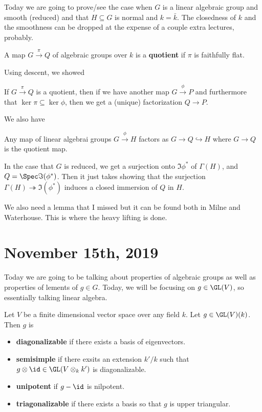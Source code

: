 \documentclass[12pt]{article}
\begin{document}
Today we are going to prove/see the case when $G$ is a linear algebraic group and smooth (reduced) and that $H\subseteq G$ is normal and $k=\bar k$.
The closedness of $k$ and the smoothness can be dropped at the expense of a couple extra lectures, probably.

\begin{defn}
	A map $G\xrightarrow{\pi} Q$ of algebraic groups over $k$ is a \textbf{quotient} if $\pi$ is faithfully flat.
\end{defn}

Using descent, we showed 
\begin{prop}
	If $G\xrightarrow{\pi} Q$ is a quotient, then  if we have another map $G\xrightarrow{\phi} P$ and furthermore that $\ker\pi\subseteq \ker\phi$,
	then we get a (unique) factorization $Q\to P$.
\end{prop}

We also have
\begin{prop}
	Any map of linear algebrai groups $G\xrightarrow{\phi} H$ factors as $G\to Q\hookrightarrow H$ where $G\to Q$ is the quotient map.
\end{prop}
\begin{prf}
	In the case that $G$ is reduced, we get a surjection onto $\Im\phi^\ast$ of $\Gamma(H)$, and $Q=\Spec\Im(\phi^\ast)$.
	Then it just takes showing that the surjection $\Gamma(H)\twoheadrightarrow \Im(\phi^\ast)$ induces a closed immersion of $Q$ in $H$.
	
	We also need a lemma that I missed but it can be found both in Milne and Waterhouse. This is where the heavy lifting is done.
\end{prf}
\section{November 15th, 2019}
Today we are going to be talking about properties of algebraic groups as well as properties of lements of $g\in G$. Today, we will be focusing on 
$g\in \GL(V)$, so essentially talking linear algebra.

\begin{defn}
	Let $V$ be a finite dimensional vector space over any field $k$. Let $g\in \GL(V)(k)$. Then $g$ is
	\begin{itemize}
		\item \textbf{diagonalizable} if there exists a basis of eigenvectors.
		\item \textbf{semisimple} if there exsits an extension $k'/k$ such that $g\otimes\id\in\GL(V\otimes_kk')$ is diagonalizable.
		\item \textbf{unipotent} if $g-\id$ is nilpotent.
		\item \textbf{triagonalizable} if there exists a basis so that $g$ is upper triangular.
	\end{itemize}
\end{defn}
\end{document}
